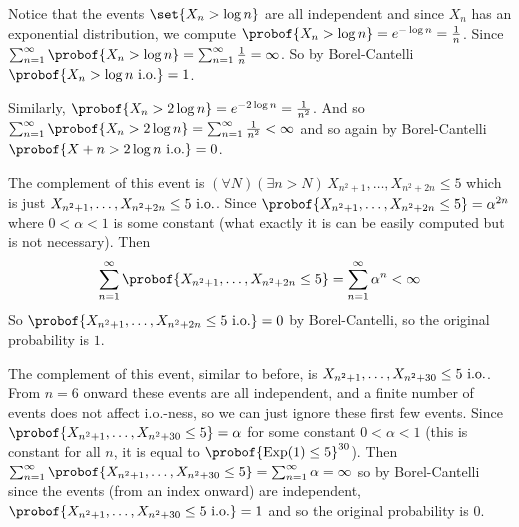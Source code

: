 \eexerc

\benum
    \item Notice that the events $\set{X_n>\log n}$ are all independent and since $X_n$ has an exponential distribution, we compute $\probof{X_n>\log n}=e^{-\log n}=\frac1n$.
    Since $\sum_{n=1}^\infty\probof{X_n>\log n}=\sum_{n=1}^\infty\frac1n=\infty$.
    So by Borel-Cantelli $\probof{X_n>\log n\hbox{ i.o.}}=1$.
    \item Similarly, $\probof{X_n>2\log n}=e^{-2\log n}=\frac1{n^2}$.
    And so $\sum_{n=1}^\infty\probof{X_n>2\log n}=\sum_{n=1}^\infty\frac1{n^2}<\infty$ and so again by Borel-Cantelli $\probof{X+n>2\log n\hbox{ i.o.}}=0$.
    \item The complement of this event is $(\forall N)(\exists n>N)\,X_{n^2+1},\dots,X_{n^2+2n}\leq 5$ which is just $X_{n^2+1},\dots,X_{n^2+2n}\leq5\hbox{ i.o.}$.
    Since $\probof{X_{n^2+1},\dots,X_{n^2+2n}\leq5} = \alpha^{2n}$ where $0<\alpha<1$ is some constant (what exactly it is can be easily computed but is not necessary).
    Then
    $$ \sum_{n=1}^\infty\probof{X_{n^2+1},\dots,X_{n^2+2n}\leq5} = \sum_{n=1}^\infty\alpha^n < \infty $$
    So $\probof{X_{n^2+1},\dots,X_{n^2+2n}\leq5\hbox{ i.o.}}=0$ by Borel-Cantelli, so the original probability is $1$.
    \item The complement of this event, similar to before, is $X_{n^2+1},\dots,X_{n^2+30}\leq5\hbox{ i.o.}$.
    From $n=6$ onward these events are all independent, and a finite number of events does not affect i.o.-ness, so we can just ignore these first few events.
    Since $\probof{X_{n^2+1},\dots,X_{n^2+30}\leq5}=\alpha$ for some constant $0<\alpha<1$ (this is constant for all $n$, it is equal to $\probof{{\rm Exp}(1)\leq5}^{30}$).
    Then $\sum_{n=1}^\infty\probof{X_{n^2+1},\dots,X_{n^2+30}\leq5}=\sum_{n=1}^\infty\alpha=\infty$ so by Borel-Cantelli since the events (from an index onward) are independent,
    $\probof{X_{n^2+1},\dots,X_{n^2+30}\leq5\hbox{ i.o.}}=1$ and so the original probability is $0$.
\eenum

\bye

